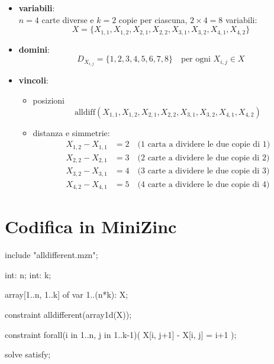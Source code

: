 \documentclass[12pt]{article}
\begin{document}
\begin{itemize}
    \item \textbf{variabili}: \\
     $n=4$ carte diverse e $k=2$ copie per ciascuna, $2 \times 4 = 8$ variabili:
    $$X = \{X_{1,1}, X_{1,2}, X_{2,1}, X_{2,2}, X_{3,1}, X_{3,2}, X_{4,1}, X_{4,2}\}$$
    
    \item \textbf{domini}: \\
        $$D_{X_{i,j}} = \{1, 2, 3, 4, 5, 6, 7, 8\} \quad \text{per ogni } X_{i,j} \in X$$
    
    \item \textbf{vincoli}:
    \begin{itemize}
        \item posizioni
            $$\text{alldiff}(X_{1,1}, X_{1,2}, X_{2,1}, X_{2,2}, X_{3,1}, X_{3,2}, X_{4,1}, X_{4,2})$$
        
        \item distanza e simmetrie:
        \begin{align*}
            X_{1,2} - X_{1,1} &= 2 \quad \text{(1 carta a dividere le due copie di 1)} \\
            X_{2,2} - X_{2,1} &= 3 \quad \text{(2 carte a dividere le due copie di 2)} \\
            X_{3,2} - X_{3,1} &= 4 \quad \text{(3 carte a dividere le due copie di 3)} \\
            X_{4,2} - X_{4,1} &= 5 \quad \text{(4 carte a dividere le due copie di 4)}
        \end{align*}
    \end{itemize}
\end{itemize}

\section{Codifica in MiniZinc}

\begin{mznbox}{}
include "alldifferent.mzn";

int: n;
int: k;

array[1..n, 1..k] of var 1..(n*k): X;

constraint alldifferent(array1d(X));

constraint forall(i in 1..n, j in 1..k-1)(
    X[i, j+1] - X[i, j] = i+1
);

solve satisfy;
\end{mznbox}
\end{document}
